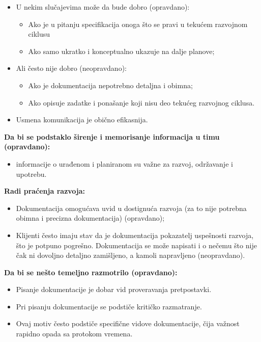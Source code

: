 \documentclass[a4paper]{article}
\begin{document}
  \begin{itemize}
    \item U nekim slučajevima može da bude dobro (opravdano): 
          \begin{itemize}
            \item Ako je u pitanju specifikacija onoga što se 
                  pravi u tekućem razvojnom ciklusu 
            \item Ako samo ukratko i konceptualno ukazuje na dalje planove;
          \end{itemize}
    \item Ali često nije dobro (neopravdano):
      \begin{itemize}
        \item Ako je dokumentacija nepotrebno detaljna i obimna;
        \item Ako opisuje zadatke i ponašanje koji nisu deo tekućeg razvojnog ciklusa.
      \end{itemize}
    \item Usmena komunikacija je obično efikasnija.
  \end{itemize}
  \textbf{Da bi se podstaklo širenje i memorisanje informacija u timu (opravdano):} 
    \begin{itemize}
      \item informacije o urađenom i planiranom su važne za razvoj, održavanje i upotrebu.
    \end{itemize}
  \textbf{Radi praćenja razvoja:}
  \begin{itemize}
    \item Dokumentacija omogućava uvid u dostignuća razvoja (za to nije potrebna obimna i 
          precizna dokumentacija) (opravdano);
    \item Klijenti često imaju stav da je dokumentacija pokazatelj uspešnosti razvoja, što  je potpuno 
          pogrešno. Dokumentacija se može napisati i o nečemu što nije čak ni dovoljno detaljno 
          zamišljeno, a kamoli napravljeno (neopravdano).
  \end{itemize}
  \textbf{Da bi se nešto temeljno razmotrilo (opravdano):}
  \begin{itemize}
    \item Pisanje dokumentacije je dobar vid proveravanja pretpostavki.
    \item Pri pisanju dokumentacije se podstiče kritičko razmatranje.
    \item Ovaj motiv često podstiče specifične vidove dokumentacije, čija važnost rapidno 
          opada sa protokom vremena.
  \end{itemize}
\end{document}
